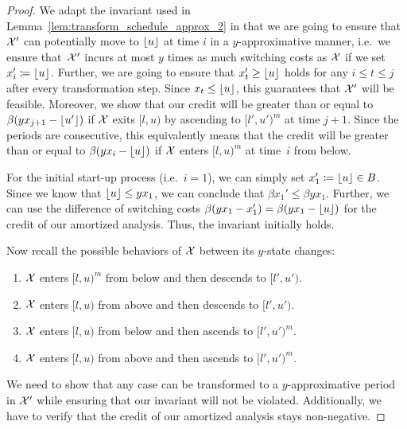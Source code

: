 \begin{proof}
We adapt the invariant used in Lemma~\ref{lem:transform_schedule_approx_2} in that we are going to ensure that $\mathcal{X}'$ can potentially move to $\lfloor u\rfloor$ at time $i$ in a $y$-approximative manner, i.e.\ we ensure that~$\mathcal{X}'$ incurs at most $y$ times as much switching costs as $\mathcal{X}$ if we set $x_i'\coloneqq \lfloor u\rfloor$. Further, we are going to ensure that $x_t'\ge \lfloor u\rfloor$ holds for any $i\le t\le j$ after every transformation step. Since $x_t\le \lfloor u\rfloor$, this guarantees that $\mathcal{X}'$ will be feasible.
Moreover, we show that our credit will be greater than or equal to $\beta(yx_{j+1}-\lfloor u'\rfloor)$ if $\mathcal{X}$ exits $[l,u)$ by ascending to $[l',u')^m$ at time $j+1$. Since the periods are consecutive, this equivalently means that the credit will be greater than or equal to $\beta(yx_i-\lfloor u\rfloor)$ if $\mathcal{X}$ enters $[l,u)^m$ at time~$i$ from below.

	For the initial start-up process (i.e.\ $i=1$), we can simply set $x_1'\coloneqq \lfloor u\rfloor \in B$. Since we know that $\lfloor u\rfloor\le yx_1$, we can conclude that $\beta x_1'\le\beta yx_1$. Further, we can use the difference of switching costs $\beta(yx_1-x_1')=\beta(yx_1-\lfloor u\rfloor)$ for the credit of our amortized analysis. Thus, the invariant initially holds.

Now recall the possible behaviors of $\mathcal{X}$ between its $y$-state changes:
\begin{enumerate}[label=(\alph*)]
	\item $\mathcal{X}$ enters $[l,u)^m$ from below and then descends to $[l',u')$.\label{itm:schedule_behavior_up_down_y}
	\item $\mathcal{X}$ enters $[l,u)$ from above and then descends to $[l',u')$.\label{itm:schedule_behavior_down_down_y}
	\item $\mathcal{X}$ enters $[l,u)$ from below and then ascends to $[l',u')^m$.\label{itm:schedule_behavior_up_up_y} 
	\item $\mathcal{X}$ enters $[l,u)$ from above and then ascends to $[l',u')^m$.\label{itm:schedule_behavior_down_up_y} 
\end{enumerate}
We need to show that any case can be transformed to a $y$-approximative period in $\mathcal{X}'$ while ensuring that our invariant will not be violated. Additionally, we have to verify that the credit of our amortized analysis stays non-negative.


\end{proof}
